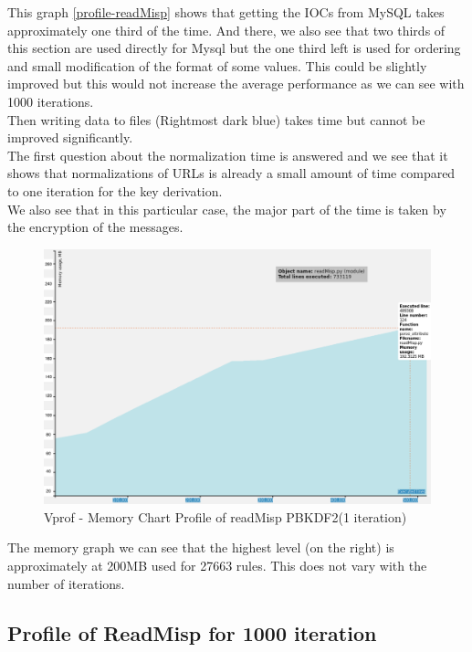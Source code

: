 \documentclass{eplmastersthesis}
\begin{document}
This graph \ref{profile-readMisp} shows that getting the IOCs from MySQL takes approximately one third of the time. And there, we also see that two thirds of this section are used directly for Mysql but the one third left is used for ordering and small modification of the format of some values. This could be slightly improved but this would not increase the average performance as we can see with 1000 iterations.\\
Then writing data to files (Rightmost dark blue) takes time but cannot be improved significantly.\\  
The first question about the normalization time is answered and we see that it shows that normalizations of URLs is already a small amount of time compared to one iteration for the key derivation.\\
We also see that in this particular case, the major part of the time is taken by the encryption of the messages.

\begin{figure}[h!]
\begin{center}
	\includegraphics[scale=0.3]{res/profile-mem-readMisp-1iter}
	\caption{Vprof - Memory Chart Profile of readMisp PBKDF2(1 iteration)}
	\label{profile-mem-readMisp}
\end{center}
\end{figure}

The memory graph we can see that the highest level (on the right) is approximately at 200MB used for 27663 rules. This does not vary with the number of iterations.\\ 

\subsection{Profile of ReadMisp for 1000 iteration}
\end{document}
